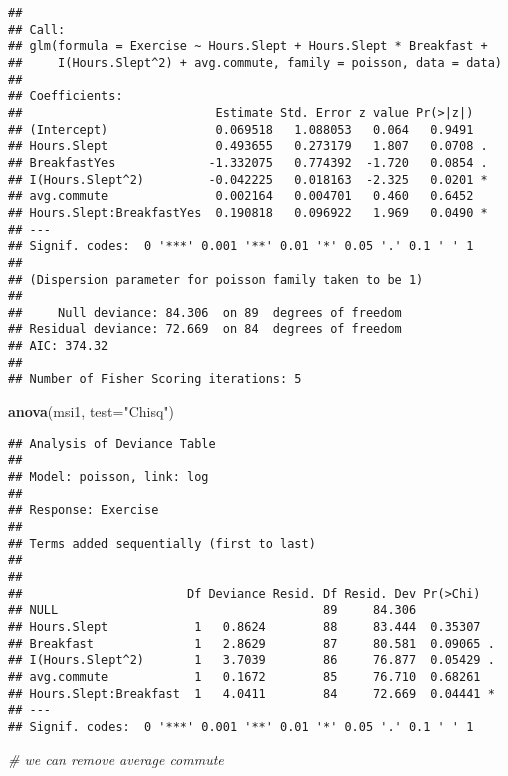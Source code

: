 \documentclass[
]{article}
\newenvironment{Shaded}{\begin{snugshade}}{\end{snugshade}}
\newcommand{\AttributeTok}[1]{\textcolor[rgb]{0.13,0.29,0.53}{#1}}
\newcommand{\CommentTok}[1]{\textcolor[rgb]{0.56,0.35,0.01}{\textit{#1}}}
\newcommand{\FunctionTok}[1]{\textcolor[rgb]{0.13,0.29,0.53}{\textbf{#1}}}
\newcommand{\NormalTok}[1]{#1}
\newcommand{\StringTok}[1]{\textcolor[rgb]{0.31,0.60,0.02}{#1}}
\begin{document}
\begin{verbatim}
## 
## Call:
## glm(formula = Exercise ~ Hours.Slept + Hours.Slept * Breakfast + 
##     I(Hours.Slept^2) + avg.commute, family = poisson, data = data)
## 
## Coefficients:
##                           Estimate Std. Error z value Pr(>|z|)  
## (Intercept)               0.069518   1.088053   0.064   0.9491  
## Hours.Slept               0.493655   0.273179   1.807   0.0708 .
## BreakfastYes             -1.332075   0.774392  -1.720   0.0854 .
## I(Hours.Slept^2)         -0.042225   0.018163  -2.325   0.0201 *
## avg.commute               0.002164   0.004701   0.460   0.6452  
## Hours.Slept:BreakfastYes  0.190818   0.096922   1.969   0.0490 *
## ---
## Signif. codes:  0 '***' 0.001 '**' 0.01 '*' 0.05 '.' 0.1 ' ' 1
## 
## (Dispersion parameter for poisson family taken to be 1)
## 
##     Null deviance: 84.306  on 89  degrees of freedom
## Residual deviance: 72.669  on 84  degrees of freedom
## AIC: 374.32
## 
## Number of Fisher Scoring iterations: 5
\end{verbatim}

\begin{Shaded}
\begin{Highlighting}[]
\FunctionTok{anova}\NormalTok{(msi1, }\AttributeTok{test=}\StringTok{"Chisq"}\NormalTok{)}
\end{Highlighting}
\end{Shaded}

\begin{verbatim}
## Analysis of Deviance Table
## 
## Model: poisson, link: log
## 
## Response: Exercise
## 
## Terms added sequentially (first to last)
## 
## 
##                       Df Deviance Resid. Df Resid. Dev Pr(>Chi)  
## NULL                                     89     84.306           
## Hours.Slept            1   0.8624        88     83.444  0.35307  
## Breakfast              1   2.8629        87     80.581  0.09065 .
## I(Hours.Slept^2)       1   3.7039        86     76.877  0.05429 .
## avg.commute            1   0.1672        85     76.710  0.68261  
## Hours.Slept:Breakfast  1   4.0411        84     72.669  0.04441 *
## ---
## Signif. codes:  0 '***' 0.001 '**' 0.01 '*' 0.05 '.' 0.1 ' ' 1
\end{verbatim}

\begin{Shaded}
\begin{Highlighting}[]
\CommentTok{\# we can remove average commute}
\end{Highlighting}
\end{Shaded}
\end{document}
